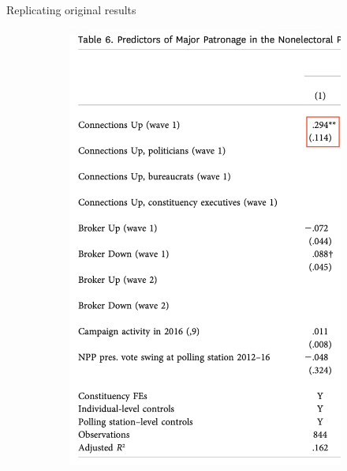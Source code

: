 \documentclass[10pt,table,aspectratio=169]{beamer}
\begin{document}
\begin{frame}[plain, label = two_dimensions]{Replicating original results}
\begin{figure}[H]
\begin{subfigure}{0.2\textwidth}
        \includegraphics[width=\linewidth]{figures/observational_replication_t6.png}
    \end{subfigure}
    \hfill
    \begin{subfigure}{0.3\textwidth}
        \centering

\end{subfigure}
\end{figure}
\end{frame}
\end{document}
